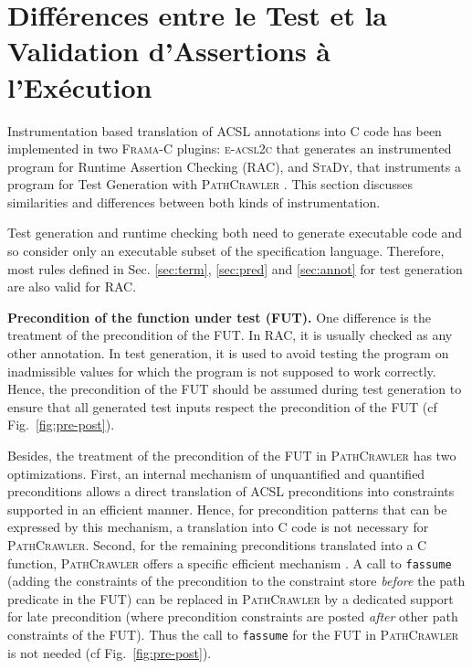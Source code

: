 \section{Différences entre le Test et la Validation d'Assertions à l'Exécution}


Instrumentation based translation of ACSL annotations into C code 
has been implemented in two \textsc{Frama-C} \cite{Frama-C} plugins:
\textsc{e-acsl2c} \cite{Delahaye/SAC13,Kosmatov/RV13} that generates an instrumented program
for Runtime Assertion Checking (RAC), and \textsc{StaDy}, that instruments a program for Test Generation with
\textsc{PathCrawler} \cite{PathCrawler}. 
This section  discusses similarities and differences between both kinds of instrumentation.

Test generation and runtime checking both need to
generate executable code and so consider only an executable subset of the
specification language. 
Therefore, most rules defined in Sec. \ref{sec:term}, \ref{sec:pred} and \ref{sec:annot} 
for test generation are also valid for RAC.

\textbf{Precondition of the function under test (FUT).}
One difference is the treatment of the precondition of the FUT.
In RAC, it is usually checked as any other annotation.
In test generation, it is used to avoid testing the program on inadmissible values 
for which the program is not supposed to work correctly.
Hence, the precondition  of the FUT should be assumed during test generation
to ensure that all generated test inputs respect the precondition of the FUT 
(cf Fig.~\ref{fig:pre-post}).

Besides, the treatment of the precondition of the FUT in \textsc{PathCrawler} has two optimizations.
First, an internal mechanism of unquantified and quantified preconditions
allows a direct translation of ACSL preconditions into constraints
supported in an efficient manner.
Hence, for precondition patterns that can be expressed by this mechanism,
a translation into C code is not necessary for \textsc{PathCrawler}.
Second, for the remaining preconditions translated into a C function, 
\textsc{PathCrawler} offers a specific
efficient mechanism \cite{Delahaye/RV13}.
A call to \lstinline|fassume| (adding the constraints of the
precondition to the constraint store \emph{before} the path predicate in the FUT)
can be replaced in \textsc{PathCrawler} by a dedicated support for
late precondition (where precondition constraints are posted \emph{after}
other path constraints of the FUT).
Thus the call to \lstinline|fassume| for the FUT 
in \textsc{PathCrawler} is not needed (cf Fig.~\ref{fig:pre-post}).

